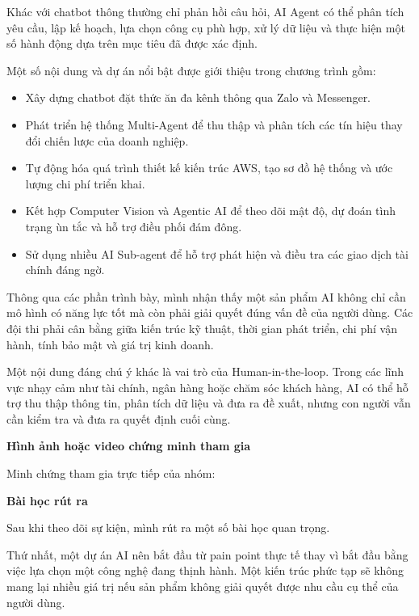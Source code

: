 Khác với chatbot thông thường chỉ phản hồi câu hỏi, AI Agent có thể phân
tích yêu cầu, lập kế hoạch, lựa chọn công cụ phù hợp, xử lý dữ liệu và
thực hiện một số hành động dựa trên mục tiêu đã được xác định.

Một số nội dung và dự án nổi bật được giới thiệu trong chương trình gồm:

\begin{itemize}
\tightlist
\item
  Xây dựng chatbot đặt thức ăn đa kênh thông qua Zalo và Messenger.
\item
  Phát triển hệ thống Multi-Agent để thu thập và phân tích các tín hiệu
  thay đổi chiến lược của doanh nghiệp.
\item
  Tự động hóa quá trình thiết kế kiến trúc AWS, tạo sơ đồ hệ thống và
  ước lượng chi phí triển khai.
\item
  Kết hợp Computer Vision và Agentic AI để theo dõi mật độ, dự đoán tình
  trạng ùn tắc và hỗ trợ điều phối đám đông.
\item
  Sử dụng nhiều AI Sub-agent để hỗ trợ phát hiện và điều tra các giao
  dịch tài chính đáng ngờ.
\end{itemize}

Thông qua các phần trình bày, mình nhận thấy một sản phẩm AI không chỉ
cần mô hình có năng lực tốt mà còn phải giải quyết đúng vấn đề của người
dùng. Các đội thi phải cân bằng giữa kiến trúc kỹ thuật, thời gian phát
triển, chi phí vận hành, tính bảo mật và giá trị kinh doanh.

Một nội dung đáng chú ý khác là vai trò của Human-in-the-loop. Trong các
lĩnh vực nhạy cảm như tài chính, ngân hàng hoặc chăm sóc khách hàng, AI
có thể hỗ trợ thu thập thông tin, phân tích dữ liệu và đưa ra đề xuất,
nhưng con người vẫn cần kiểm tra và đưa ra quyết định cuối cùng.

\vspace{0.5em}\noindent\textbf{Hình ảnh hoặc video chứng minh tham
gia}\par

Minh chứng tham gia trực tiếp của nhóm:

\vspace{0.5em}\noindent\textbf{Bài học rút ra}\par

Sau khi theo dõi sự kiện, mình rút ra một số bài học quan trọng.

Thứ nhất, một dự án AI nên bắt đầu từ pain point thực tế thay vì bắt đầu
bằng việc lựa chọn một công nghệ đang thịnh hành. Một kiến trúc phức tạp
sẽ không mang lại nhiều giá trị nếu sản phẩm không giải quyết được nhu
cầu cụ thể của người dùng.

